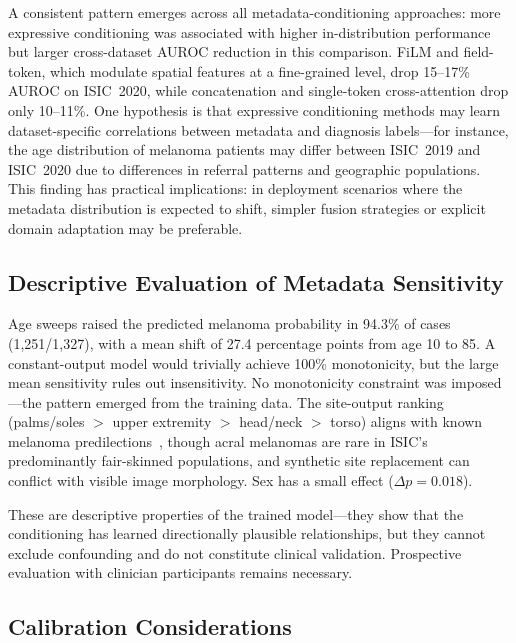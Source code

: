 \documentclass[12pt, a4paper]{article}
\begin{document}
A consistent pattern emerges across all metadata-conditioning approaches: more expressive conditioning was associated with higher in-distribution performance but larger cross-dataset AUROC reduction in this comparison. FiLM and field-token, which modulate spatial features at a fine-grained level, drop 15--17\% AUROC on ISIC~2020, while concatenation and single-token cross-attention drop only 10--11\%. One hypothesis is that expressive conditioning methods may learn dataset-specific correlations between metadata and diagnosis labels---for instance, the age distribution of melanoma patients may differ between ISIC~2019 and ISIC~2020 due to differences in referral patterns and geographic populations. This finding has practical implications: in deployment scenarios where the metadata distribution is expected to shift, simpler fusion strategies or explicit domain adaptation may be preferable.

\subsection{Descriptive Evaluation of Metadata Sensitivity}
\label{sec:sensitivity_discussion}

Age sweeps raised the predicted melanoma probability in 94.3\% of cases (1{,}251/1{,}327), with a mean shift of 27.4 percentage points from age 10 to 85. A constant-output model would trivially achieve 100\% monotonicity, but the large mean sensitivity rules out insensitivity. No monotonicity constraint was imposed---the pattern emerged from the training data. The site-output ranking (palms/soles $>$ upper extremity $>$ head/neck $>$ torso) aligns with known melanoma predilections~\citep{bradford2009acral, elwood1998distribution}, though acral melanomas are rare in ISIC's predominantly fair-skinned populations, and synthetic site replacement can conflict with visible image morphology. Sex has a small effect ($\Delta p = 0.018$).

These are descriptive properties of the trained model---they show that the conditioning has learned directionally plausible relationships, but they cannot exclude confounding and do not constitute clinical validation. Prospective evaluation with clinician participants remains necessary.

\subsection{Calibration Considerations}
\end{document}
